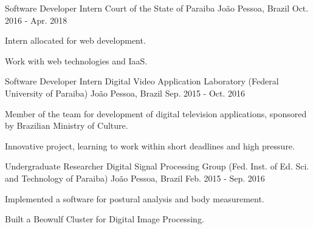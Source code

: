 \begin{cventries}
  \cventry
    {Software Developer Intern} %
    {Court of the State of Paraiba} %
    {João Pessoa, Brazil} %
    {Oct. 2016 - Apr. 2018} %
    {
      \begin{cvitems} %
        \item {Intern allocated for web development.}
        \item {Work with web technologies and IaaS.}
      \end{cvitems}
    }
    
  \cventry
    {Software Developer Intern} %
    {Digital Video Application Laboratory (Federal University of Paraiba)} %
    {João Pessoa, Brazil} %
    {Sep. 2015 - Oct. 2016} %
    {
      \begin{cvitems} %
        \item {Member of the team for development of digital television applications, sponsored by Brazilian Ministry of Culture.}
        \item {Innovative project, learning to work within short deadlines and high pressure.}
      \end{cvitems}
    }
    
  \cventry
    {Undergraduate Researcher} %
    {Digital Signal Processing Group (Fed. Inst. of Ed. Sci. and Technology of Paraiba)} %
    {João Pessoa, Brazil} %
    {Feb. 2015 - Sep. 2016} %
    {
      \begin{cvitems} %
        \item {Implemented a software for postural analysis and body measurement.}
        \item {Built a Beowulf Cluster for Digital Image Processing.}
      \end{cvitems}
    }


\end{cventries}
